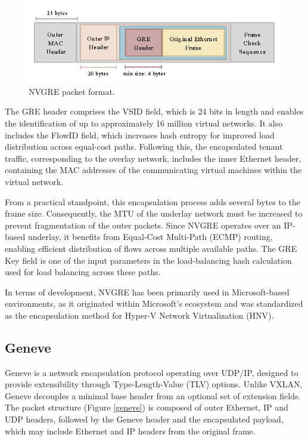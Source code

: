 \begin{figure} [H]
    \centering
    \includegraphics[width=0.6\linewidth]{Figures/NVGREpacket.png}
    \caption{NVGRE packet format. \cite{NVGRE}}
    \label{nvgre}
\end{figure}

The GRE header comprises the VSID field, which is 24 bits in length and enables the identification of up to approximately 16 million virtual networks. It also includes the FlowID field, which increases hash entropy for improved load distribution across equal-cost paths. Following this, the encapsulated tenant traffic, corresponding to the overlay network, includes the inner Ethernet header, containing the MAC addresses of the communicating virtual machines within the virtual network.

From a practical standpoint, this encapsulation process adds several bytes to the frame size. Consequently, the MTU of the underlay network must be increased to prevent fragmentation of the outer packets. Since NVGRE operates over an IP-based underlay, it benefits from Equal-Cost Multi-Path (ECMP) routing, enabling efficient distribution of flows across multiple available paths. The GRE Key field is one of the input parameters in the load-balancing hash calculation used for load balancing across these paths.

In terms of development, NVGRE has been primarily used in Microsoft-based environments, as it originated within Microsoft’s ecosystem and was standardized as the encapsulation method for Hyper-V Network Virtualization (HNV).

\subsection{Geneve}
Geneve is a network encapsulation protocol operating over UDP/IP, designed to provide extensibility through Type-Length-Value (TLV) options. Unlike VXLAN, Geneve decouples a minimal base header from an optional set of extension fields. The packet structure (Figure \ref{geneve}) is composed of outer Ethernet, IP and UDP headers, followed by the Geneve header and the encapsulated payload, which may include Ethernet and IP headers from the original frame.

